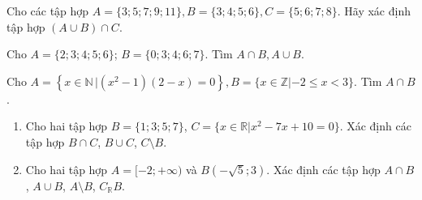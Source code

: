 \begin{bt}%
	Cho các tập hợp $A=\{3;5;7;9;11\},B=\{3;4;5;6\},C=\{5;6;7;8\}$. Hãy xác định tập hợp $(A\cup B)\cap C$.\\
\end{bt}

\begin{bt}%
	Cho $A=\{2; 3; 4; 5; 6\}$; $B=\{0; 3; 4; 6; 7\}$. Tìm $A \cap B, A \cup B$.
\end{bt}

\begin{bt}%
 Cho $A=\left\{x \in \mathbb{N}\,|\left(x^2-1\right)(2-x)=0\right\}, B=\{x \in \mathbb{Z}|-2 \leq x<3\}$. Tìm $ A \cap B$.
\end{bt}

\begin{bt}%
	\begin{enumerate}
		\item Cho hai tập hợp $B=\{1;3;5;7\}$, $C=\{x\in \mathbb{R}\big| x^2-7x+10=0\}$. Xác định các tập hợp $B\cap C$, $B\cup C$, $C\setminus B$.
		\item Cho hai tập hợp $A=[-2;+\infty)$ và $B(-\sqrt{5};3)$. Xác định các tập hợp $A\cap B$, $A\cup B$, $A\setminus B$, $C_{\mathbb{R}}B$.
	\end{enumerate}
\loigiai{
\begin{enumerate}
	\item Ta có $C=\{2;5\}$.\\
	Suy ra $B\cap C=\{5\}$, $B\cup C=\{1;3;5;7;2\}$, $C\setminus B=\{2\}$.
	\item $A\cap B=[-2;3)$, $A\cup B=(-\sqrt{5};+\infty)$, $A\setminus B=[3;+\infty)$, $C_{\mathbb{R}}B=(-\infty;-\sqrt{5}]\cup [3;+\infty)$.
\end{enumerate}
}
\end{bt}


